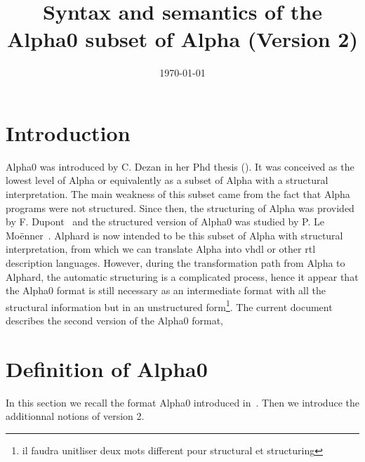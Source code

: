 \documentclass[a4paper,11pt]{article}
\newcommand{\Alpha}{{{Alpha}}}
\newcommand{\AlphaZ}{{{\Alpha}0}}
\newcommand{\Alphard}{{Alphard}}
\newcommand{\vhdl}{{\sc vhdl} }
\begin{document}
\title{Syntax and semantics of the {\AlphaZ} subset of Alpha (Version 2)}
\author{}
\date{\today}

 \maketitle


\section{Introduction}
{\AlphaZ} was introduced by C. Dezan in her Phd thesis (\cite{dezan}). It 
was conceived as the lowest level of {\Alpha} or equivalently as a subset of 
{\Alpha} with a structural interpretation. The main weakness of 
this subset came from the fact that {\Alpha} programs were not structured.
Since then, the structuring of 
{\Alpha} was provided by F. Dupont~\cite{DupontQuRi95} and the structured 
version of {\AlphaZ} was studied by P. Le Mo\"enner~\cite{Patricia96}.
{\Alphard} is now intended to be this subset of {\Alpha} with structural 
interpretation, from which we can translate {\Alpha} into {\vhdl} or other 
{\sc rtl} description languages. However, during the 
transformation path from {\Alpha} to {\Alphard}, the automatic structuring 
is a complicated process, hence it appear that the {\AlphaZ} format is still 
necessary as an intermediate format with all the structural information 
but in an unstructured form\footnote{il faudra unitliser deux mots different 
pour structural et structuring}. The current document describes the second 
version of the {\AlphaZ} format, 

\section{Definition of {\AlphaZ}}
In this section we recall the format {\AlphaZ} 
introduced in~\cite{dezan}. 
Then we introduce the additionnal notions of version 2.
\end{document}
